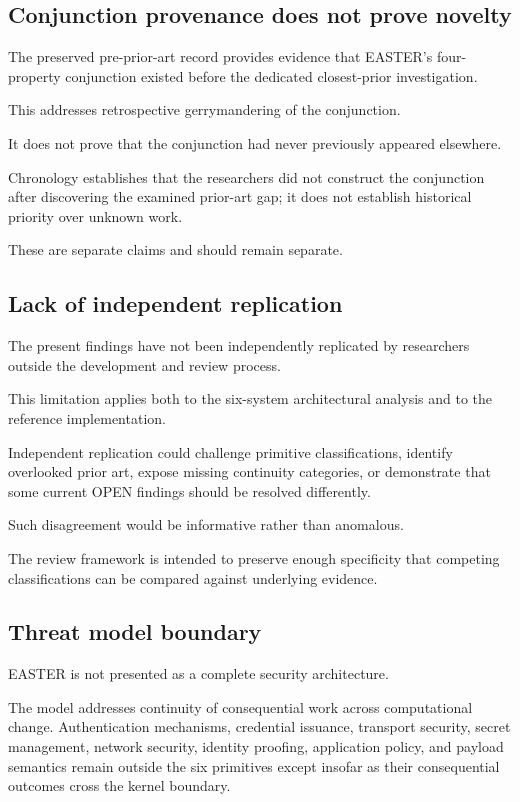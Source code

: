 \documentclass[11pt]{article}
\begin{document}
\subsection{Conjunction provenance does not prove novelty}

The preserved pre-prior-art record provides evidence that EASTER's four-property conjunction existed before the dedicated closest-prior investigation.

This addresses retrospective gerrymandering of the conjunction.

It does not prove that the conjunction had never previously appeared elsewhere.

Chronology establishes that the researchers did not construct the conjunction after discovering the examined prior-art gap; it does not establish historical priority over unknown work.

These are separate claims and should remain separate.

\subsection{Lack of independent replication}

The present findings have not been independently replicated by researchers outside the development and review process.

This limitation applies both to the six-system architectural analysis and to the reference implementation.

Independent replication could challenge primitive classifications, identify overlooked prior art, expose missing continuity categories, or demonstrate that some current OPEN findings should be resolved differently.

Such disagreement would be informative rather than anomalous.

The review framework is intended to preserve enough specificity that competing classifications can be compared against underlying evidence.

\subsection{Threat model boundary}

EASTER is not presented as a complete security architecture.

The model addresses continuity of consequential work across computational change. Authentication mechanisms, credential issuance, transport security, secret management, network security, identity proofing, application policy, and payload semantics remain outside the six primitives except insofar as their consequential outcomes cross the kernel boundary.
\end{document}
